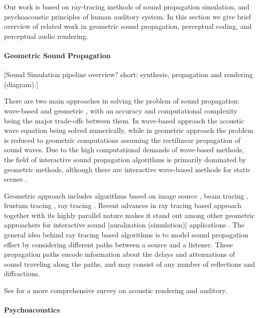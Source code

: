 Our work is based on ray-tracing methods of sound propagation simulation, and psychoacoustic principles of human auditory system. In this section we give brief overview of related work in geometric sound propagation, perceptual coding, and perceptual audio rendering.

\paragraph{Geometric Sound Propagation} 

[Sound Simulation pipeline overview? short: synthesis, propagation and rendering (diagram).]

There are two main approaches in solving the problem of sound propagation: wave-based \cite{savioja2010real,thompson2006review,gumerov2009wideband} and geometric \cite{funkhouser2003survey}, with an accuracy and computational complexity being the major trade-offs between them. In wave-based approach the acoustic wave equation being solved numerically, while in geometric approach the problem is reduced to geometric computations assuming the rectilinear propagation of sound waves. Due to the high computational demands of wave-based methods, the field of interactive sound propagation algorithms is primarily dominated by geometric methods, although there are interactive wave-based methods for static scenes \cite{raghuvanshi2010precomputed,mehra2013wave}.

Geometric approach includes algorithms based on image source \cite{borish1984extension}, beam tracing \cite{tsingos2001modeling}, frustum tracing \cite{chandak2009fastv}, ray tracing \cite{taylor2012guided,schissler2014high}. Recent advances in ray tracing based approach together with its highly parallel nature makes it stand out among other geometric approachers for interactive sound [auralization (simulation)] applications \cite{taylor2010sound,schissler2011gsound}. The general idea behind ray tracing based algorithms is to model sound propagation effect by considering different paths between a source and a listener. These propagation paths encode information about the delays and attenuations of sound traveling along the paths, and may consist of any number of reflections and diffractions. 

See \cite{hulusic2012acoustic} for a more comprehensive survey on acoustic rendering and auditory.

\paragraph{Psychoacoustics}

